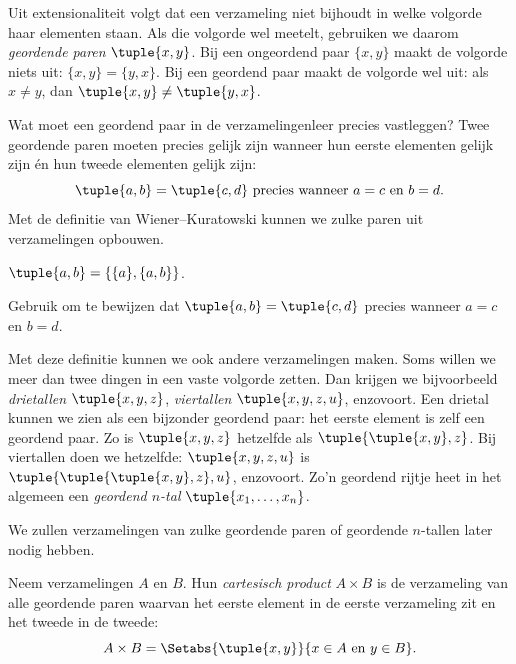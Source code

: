 \documentclass[../../../include/open-logic-section]{subfiles}
\begin{document}

\begin{explain}
Uit extensionaliteit volgt dat een verzameling niet bijhoudt in welke
volgorde haar elementen staan. Als die volgorde wel meetelt, gebruiken
we daarom \emph{geordende paren} $\tuple{x, y}$. Bij een ongeordend
paar $\{x, y\}$ maakt de volgorde niets uit: $\{x, y\} = \{y, x\}$.
Bij een geordend paar maakt de volgorde wel uit: als $x \neq y$, dan
$\tuple{x, y} \neq \tuple{y, x}$.

Wat moet een geordend paar in de verzamelingenleer precies vastleggen?
Twee geordende paren moeten precies gelijk zijn wanneer hun eerste
elementen gelijk zijn én hun tweede elementen gelijk zijn:
\[
  \tuple{a, b}= \tuple{c, d}\text{ precies wanneer }a = c \text{ en }b=d.
\]
Met de definitie van Wiener--Kuratowski kunnen we zulke paren uit
verzamelingen opbouwen.
\end{explain}

\begin{defn}
	$\tuple{a, b} = \{\{a\}, \{a, b\}\}$.
\end{defn}

\begin{prob}
	Gebruik  om te bewijzen dat
	$\tuple{a, b}= \tuple{c, d}$ precies wanneer $a = c$ en $b=d$.
\end{prob}

\begin{explain}
Met deze definitie kunnen we ook andere verzamelingen maken. Soms
willen we meer dan twee dingen in een vaste volgorde zetten. Dan
krijgen we bijvoorbeeld \emph{drietallen} $\tuple{x, y, z}$,
\emph{viertallen} $\tuple{x, y, z, u}$, enzovoort. Een drietal kunnen
we zien als een bijzonder geordend paar: het eerste element is zelf
een geordend paar. Zo is $\tuple{x, y, z}$ hetzelfde als
$\tuple{\tuple{x, y},z}$. Bij viertallen doen we hetzelfde:
$\tuple{x,y,z,u}$ is $\tuple{\tuple{\tuple{x,y},z},u}$, enzovoort.
Zo'n geordend rijtje heet in het algemeen een
\emph{geordend $n$-tal} $\tuple{x_1, \dots, x_n}$.

We zullen verzamelingen van zulke geordende paren of geordende $n$-tallen later
nodig hebben.
\end{explain}

\begin{defn}
Neem verzamelingen $A$ en $B$. Hun \emph{cartesisch product} $A
\times B$ is de verzameling van alle geordende paren waarvan het eerste
element in de eerste verzameling zit en het tweede in de tweede:
\[
  A \times B = \Setabs{\tuple{x, y}}{x \in A \text{ en } y \in B}.
\]
\end{defn}
\end{document}
